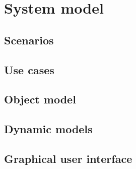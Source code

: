 \section{System model}

\subsection{Scenarios}

\subsection{Use cases}

\subsection{Object model}

\subsection{Dynamic models}

\subsection{Graphical user interface}